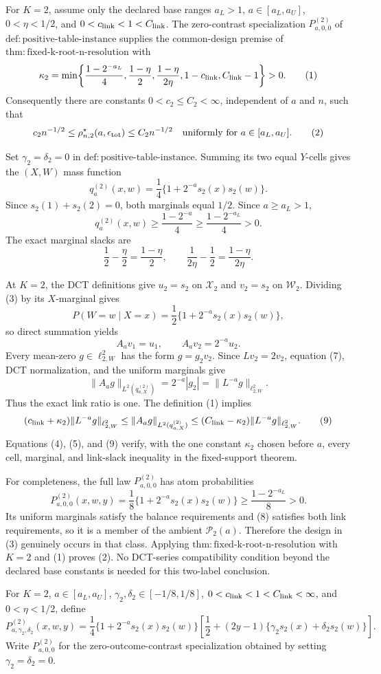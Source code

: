 For \(K=2\), assume only the declared base ranges \(a_L>1\), \(a\in[a_L,a_U]\), \(0<\eta<1/2\), and \(0<c_{\rm link}<1<C_{\rm link}\). The zero-contrast specialization \(P^{(2)}_{a,0,0}\) of \(\mathrm{def:positive\mbox{-}table\mbox{-}instance}\) supplies the common-design premise of \(\mathrm{thm:fixed\mbox{-}k\mbox{-}root\mbox{-}n\mbox{-}resolution}\) with
\[
\kappa_2
=\min\!\left\{
\frac{1-2^{-a_L}}4,
\frac{1-\eta}{2},
\frac{1-\eta}{2\eta},
1-c_{\rm link},
C_{\rm link}-1
\right\}>0.
\tag{1}
\]
Consequently there are constants \(0<c_2\le C_2<\infty\), independent of \(a\) and \(n\), such that
\[
c_2n^{-1/2}
\le \rho^\star_{n,2}(a,\epsilon_{\rm tot})
\le C_2n^{-1/2}
\quad\text{uniformly for }a\in[a_L,a_U].
\tag{2}
\]

Set \(\gamma_2=\delta_2=0\) in \(\mathrm{def:positive\mbox{-}table\mbox{-}instance}\). Summing its two equal \(Y\)-cells gives the \((X,W)\) mass function
\[
q_a^{(2)}(x,w)=\frac14\{1+2^{-a}s_2(x)s_2(w)\}.
\tag{3}
\]
Since \(s_2(1)+s_2(2)=0\), both marginals equal \(1/2\). Since \(a\ge a_L>1\),
\[
q_a^{(2)}(x,w)
\ge\frac{1-2^{-a}}4
\ge\frac{1-2^{-a_L}}4>0.
\tag{4}
\]
The exact marginal slacks are
\[
\frac12-\frac\eta2=\frac{1-\eta}{2},
\qquad
\frac1{2\eta}-\frac12=\frac{1-\eta}{2\eta}.
\tag{5}
\]

At \(K=2\), the DCT definitions give \(u_2=s_2\) on \(\mathcal X_2\) and \(v_2=s_2\) on \(\mathcal W_2\). Dividing (3) by its \(X\)-marginal gives
\[
P(W=w\mid X=x)=\frac12\{1+2^{-a}s_2(x)s_2(w)\},
\tag{6}
\]
so direct summation yields
\[
A_a v_1=u_1,
\qquad
A_av_2=2^{-a}u_2.
\tag{7}
\]
Every mean-zero \(g\in\ell^2_{2,W}\) has the form \(g=g_2v_2\). Since \(Lv_2=2v_2\), equation (7), DCT normalization, and the uniform marginals give
\[
\|A_ag\|_{L^2(q_{a,X}^{(2)})}
=2^{-a}|g_2|
=\|L^{-a}g\|_{\ell^2_{2,W}}.
\tag{8}
\]
Thus the exact link ratio is one. The definition (1) implies
\[
(c_{\rm link}+\kappa_2)\|L^{-a}g\|_{\ell^2_{2,W}}
\le\|A_ag\|_{L^2(q_{a,X}^{(2)})}
\le(C_{\rm link}-\kappa_2)\|L^{-a}g\|_{\ell^2_{2,W}}.
\tag{9}
\]
Equations (4), (5), and (9) verify, with the one constant \(\kappa_2\) chosen before \(a\), every cell, marginal, and link-slack inequality in the fixed-support theorem.

For completeness, the full law \(P^{(2)}_{a,0,0}\) has atom probabilities
\[
P^{(2)}_{a,0,0}(x,w,y)
=\frac18\{1+2^{-a}s_2(x)s_2(w)\}
\ge\frac{1-2^{-a_L}}8>0.
\tag{10}
\]
Its uniform marginals satisfy the balance requirements and (8) satisfies both link requirements, so it is a member of the ambient \(\mathcal P_2(a)\). Therefore the design in (3) genuinely occurs in that class. Applying \(\mathrm{thm:fixed\mbox{-}k\mbox{-}root\mbox{-}n\mbox{-}resolution}\) with \(K=2\) and (1) proves (2). No DCT-series compatibility condition beyond the declared base constants is needed for this two-label conclusion.

For \(K=2\), \(a\in[a_L,a_U]\), \(\gamma_2,\delta_2\in[-1/8,1/8]\), \(0<c_{\rm link}<1<C_{\rm link}<\infty\), and \(0<\eta<1/2\), define
\[
P^{(2)}_{a,\gamma_2,\delta_2}(x,w,y)
=\frac14\{1+2^{-a}s_2(x)s_2(w)\}
\left[\frac12+(2y-1)\{\gamma_2s_2(x)+\delta_2s_2(w)\}\right].
\]
Write \(P^{(2)}_{a,0,0}\) for the zero-outcome-contrast specialization obtained by setting \(\gamma_2=\delta_2=0\).
